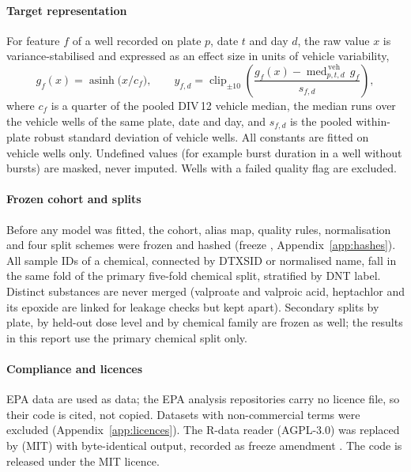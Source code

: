 \documentclass[11pt,a4paper]{article}
\newcommand{\file}[1]{\texttt{\detokenize{#1}}}
\newcommand{\appref}[1]{Appendix~\ref{#1}}
\begin{document}
\paragraph{Target representation}
For feature \(f\) of a well recorded on plate \(p\), date \(t\) and day \(d\), the raw value \(x\) is
variance-stabilised and expressed as an effect size in units of vehicle variability,
\begin{equation}\label{eq:target}
  g_f(x)=\operatorname{asinh}\!\big(x/c_f\big),\qquad
  y_{f,d}=\operatorname{clip}_{\pm 10}\!\left(\frac{g_f(x)-\operatorname{med}^{\,\mathrm{veh}}_{p,t,d}\,g_f}{s_{f,d}}\right),
\end{equation}
where \(c_f\) is a quarter of the pooled DIV\,12 vehicle median, the median runs over the vehicle wells of the
same plate, date and day, and \(s_{f,d}\) is the pooled within-plate robust standard deviation of vehicle
wells. All constants are fitted on vehicle wells only. Undefined values (for example burst duration in a well
without bursts) are masked, never imputed. Wells with a failed quality flag are excluded.

\paragraph{Frozen cohort and splits}
Before any model was fitted, the cohort, alias map, quality rules, normalisation and four split schemes were
frozen and hashed (freeze \file{G0}, \appref{app:hashes}). All sample IDs of a chemical, connected by DTXSID or
normalised name, fall in the same fold of the primary five-fold chemical split, stratified by DNT label. Distinct
substances are never merged (valproate and valproic acid, heptachlor and its epoxide are linked for leakage
checks but kept apart). Secondary splits by plate, by held-out dose level and by chemical family are frozen as
well; the results in this report use the primary chemical split only.

\paragraph{Compliance and licences}
EPA data are used as data; the EPA analysis repositories carry no licence file, so their code is cited, not
copied. Datasets with non-commercial terms were excluded (\appref{app:licences}). The R-data reader
\file{pyreadr} (AGPL-3.0) was replaced by \file{rdata} (MIT) with byte-identical output, recorded as freeze
amendment \file{G0-A001}. The code is released under the MIT licence.
\end{document}
